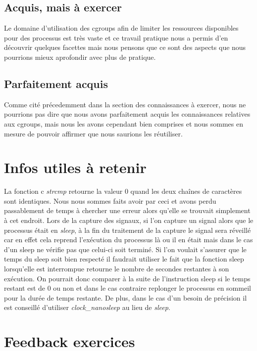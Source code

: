 \documentclass{ReportTemplate}
\begin{document}
\subsection{Acquis, mais à exercer}
Le domaine d'utilisation des cgroups afin de limiter les ressources disponibles pour des
processus est très vaste et ce travail pratique nous a permis d'en découvrir
quelques facettes mais nous pensons que ce sont des aspects que nous pourrions
mieux aprofondir avec plus de pratique.
\subsection{Parfaitement acquis}
Comme cité précedemment dans la section des connaissances à exercer, nous ne
pourrions pas dire que nous avons parfaitement acquis les connaissances
relatives aux cgroups, mais nous les avons cependant bien comprises et nous
sommes en mesure de pouvoir affirmer que nous saurions les réutiliser.
\section{Infos utiles à retenir}
La fonction c \textit{strcmp} retourne la valeur 0 quand les deux chaînes de
caractères sont identiques. Nous nous sommes faits avoir par ceci et avons perdu
passablement de temps à chercher une erreur alors qu'elle se trouvait simplement
à cet endroit.\newline
Lors de la capture des signaux, si l'on capture un signal alors que le processus
était en \textit{sleep}, à la fin du traitement de la capture le signal sera
réveillé car en effet cela reprend l'exécution du processus là ou il en était
mais dans le cas d'un sleep ne vérifie pas que celui-ci soit terminé. Si l'on
voulait s'assurer que le temps du sleep soit bien respecté il faudrait utiliser
le fait que la fonction sleep lorsqu'elle est interrompue retourne le nombre de
secondes restantes à son exécution. On pourrait donc comparer à la suite de
l'instruction sleep si le temps restant est de 0 ou non et dans le cas contraire
replonger le processus en sommeil pour la durée de temps restante. De plus, dans
le cas d'un besoin de précision il est conseillé d'utiliser \textit{clock\_nanosleep} au lieu de \textit{sleep}.
\newpage
\section{Feedback exercices}
\end{document}
